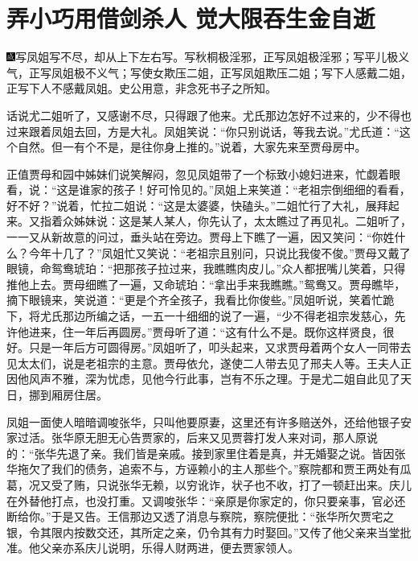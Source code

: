 
\chapter{弄小巧用借剑杀人 觉大限吞生金自逝}
{\includegraphics[width=3mm]{../Images/00005}\kaishu      写凤姐写不尽，却从上下左右写。写秋桐极淫邪，正写凤姐极淫邪；写平儿极义气，正写凤姐极不义气；写使女欺压二姐，正写凤姐欺压二姐；写下人感戴二姐，正写下人不感戴凤姐。史公用意，非念死书子之所知。}

话说尤二姐听了，又感谢不尽，只得跟了他来。尤氏那边怎好不过来的，少不得也过来跟着凤姐去回，方是大礼。凤姐笑说：``你只别说话，等我去说。''尤氏道：``这个自然。但一有个不是，是往你身上推的。''说着，大家先来至贾母房中。

正值贾母和园中姊妹们说笑解闷，忽见凤姐带了一个标致小媳妇进来，忙觑着眼看，说：``这是谁家的孩子！好可怜见的。''凤姐上来笑道：``老祖宗倒细细的看看，好不好？''说着，忙拉二姐说：``这是太婆婆，快磕头。''二姐忙行了大礼，展拜起来。又指着众姊妹说：这是某人某人，你先认了，太太瞧过了再见礼。二姐听了，一一又从新故意的问过，垂头站在旁边。贾母上下瞧了一遍，因又笑问：``你姓什么？今年十几了？''凤姐忙又笑说：``老祖宗且别问，只说比我俊不俊。''贾母又戴了眼镜，命鸳鸯琥珀：``把那孩子拉过来，我瞧瞧肉皮儿。''众人都抿嘴儿笑着，只得推他上去。贾母细瞧了一遍，又命琥珀：``拿出手来我瞧瞧。''鸳鸯又。贾母瞧毕，摘下眼镜来，笑说道：``更是个齐全孩子，我看比你俊些。''凤姐听说，笑着忙跪下，将尤氏那边所编之话，一五一十细细的说了一遍，``少不得老祖宗发慈心，先许他进来，住一年后再圆房。''贾母听了道：``这有什么不是。既你这样贤良，很好。只是一年后方可圆得房。''凤姐听了，叩头起来，又求贾母着两个女人一同带去见太太们，说是老祖宗的主意。贾母依允，遂使二人带去见了邢夫人等。王夫人正因他风声不雅，深为忧虑，见他今行此事，岂有不乐之理。于是尤二姐自此见了天日，挪到厢房住居。

凤姐一面使人暗暗调唆张华，只叫他要原妻，这里还有许多赔送外，还给他银子安家过活。张华原无胆无心告贾家的，后来又见贾蓉打发人来对词，那人原说的：``张华先退了亲。我们皆是亲戚。接到家里住着是真，并无婚娶之说。皆因张华拖欠了我们的债务，追索不与，方诬赖小的主人那些个。''察院都和贾王两处有瓜葛，况又受了贿，只说张华无赖，以穷讹诈，状子也不收，打了一顿赶出来。庆儿在外替他打点，也没打重。又调唆张华：``亲原是你家定的，你只要亲事，官必还断给你。''于是又告。王信那边又透了消息与察院，察院便批：``张华所欠贾宅之银，令其限内按数交还，其所定之亲，仍令其有力时娶回。''又传了他父亲来当堂批准。他父亲亦系庆儿说明，乐得人财两进，便去贾家领人。

